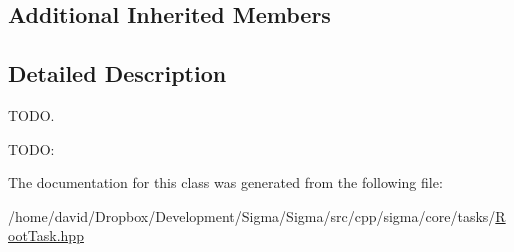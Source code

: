 \subsection*{Additional Inherited Members}


\subsection{Detailed Description}
T\-O\-D\-O. 

T\-O\-D\-O\-: 

The documentation for this class was generated from the following file\-:\begin{DoxyCompactItemize}
\item 
/home/david/\-Dropbox/\-Development/\-Sigma/\-Sigma/src/cpp/sigma/core/tasks/\hyperlink{_root_task_8hpp}{Root\-Task.\-hpp}\end{DoxyCompactItemize}
